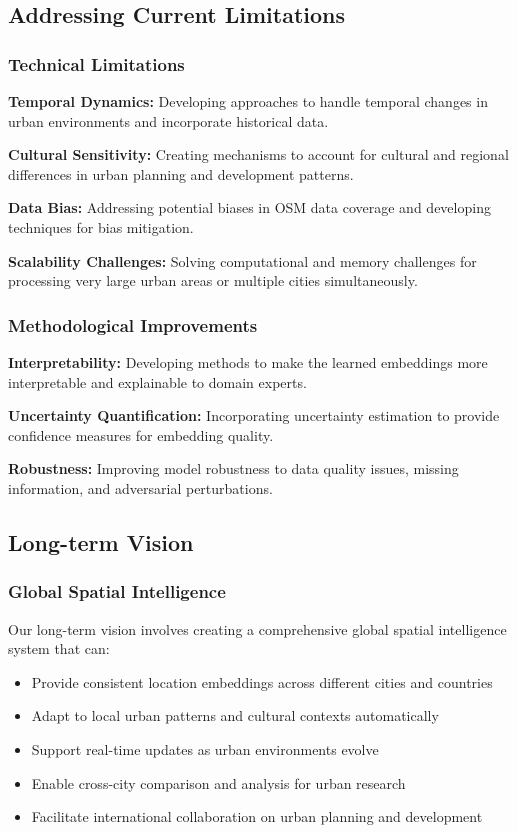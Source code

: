 \subsection{Addressing Current Limitations}

\subsubsection{Technical Limitations}

\textbf{Temporal Dynamics:} Developing approaches to handle temporal changes in urban environments and incorporate historical data.

\textbf{Cultural Sensitivity:} Creating mechanisms to account for cultural and regional differences in urban planning and development patterns.

\textbf{Data Bias:} Addressing potential biases in OSM data coverage and developing techniques for bias mitigation.

\textbf{Scalability Challenges:} Solving computational and memory challenges for processing very large urban areas or multiple cities simultaneously.

\subsubsection{Methodological Improvements}

\textbf{Interpretability:} Developing methods to make the learned embeddings more interpretable and explainable to domain experts.

\textbf{Uncertainty Quantification:} Incorporating uncertainty estimation to provide confidence measures for embedding quality.

\textbf{Robustness:} Improving model robustness to data quality issues, missing information, and adversarial perturbations.

\subsection{Long-term Vision}

\subsubsection{Global Spatial Intelligence}

Our long-term vision involves creating a comprehensive global spatial intelligence system that can:

\begin{itemize}
    \item Provide consistent location embeddings across different cities and countries
    \item Adapt to local urban patterns and cultural contexts automatically
    \item Support real-time updates as urban environments evolve
    \item Enable cross-city comparison and analysis for urban research
    \item Facilitate international collaboration on urban planning and development
\end{itemize}

